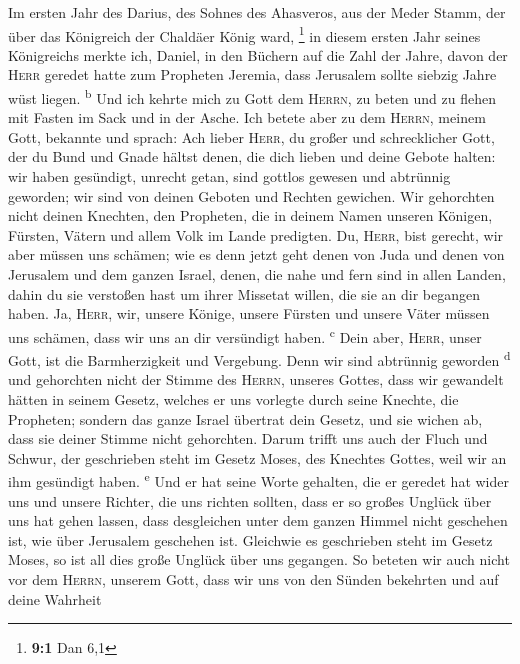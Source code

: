  Im ersten Jahr des Darius, des Sohnes des Ahasveros, aus
der Meder Stamm, der über das Königreich der Chaldäer König ward,
\footnote{\textbf{9:1} Dan 6,1}  in diesem ersten Jahr
seines Königreichs merkte ich, Daniel, in den Büchern auf die Zahl der
Jahre, davon der \textsc{Herr} geredet hatte zum Propheten Jeremia, dass
Jerusalem sollte siebzig Jahre wüst liegen. \textsuperscript{b}
 Und ich kehrte mich zu Gott dem \textsc{Herrn}, zu beten
und zu flehen mit Fasten im Sack und in der Asche.  Ich
betete aber zu dem \textsc{Herrn}, meinem Gott, bekannte und sprach: Ach
lieber \textsc{Herr}, du großer und schrecklicher Gott, der du Bund und
Gnade hältst denen, die dich lieben und deine Gebote halten:
 wir haben gesündigt, unrecht getan, sind gottlos gewesen
und abtrünnig geworden; wir sind von deinen Geboten und Rechten
gewichen.  Wir gehorchten nicht deinen Knechten, den
Propheten, die in deinem Namen unseren Königen, Fürsten, Vätern und
allem Volk im Lande predigten.  Du, \textsc{Herr}, bist
gerecht, wir aber müssen uns schämen; wie es denn jetzt geht denen von
Juda und denen von Jerusalem und dem ganzen Israel, denen, die nahe und
fern sind in allen Landen, dahin du sie verstoßen hast um ihrer Missetat
willen, die sie an dir begangen haben.  Ja, \textsc{Herr},
wir, unsere Könige, unsere Fürsten und unsere Väter müssen uns schämen,
dass wir uns an dir versündigt haben. \textsuperscript{c} 
Dein aber, \textsc{Herr}, unser Gott, ist die Barmherzigkeit und
Vergebung. Denn wir sind abtrünnig geworden \textsuperscript{d}
 und gehorchten nicht der Stimme des \textsc{Herrn},
unseres Gottes, dass wir gewandelt hätten in seinem Gesetz, welches er
uns vorlegte durch seine Knechte, die Propheten;  sondern
das ganze Israel übertrat dein Gesetz, und sie wichen ab, dass sie
deiner Stimme nicht gehorchten. Darum trifft uns auch der Fluch und
Schwur, der geschrieben steht im Gesetz Moses, des Knechtes Gottes, weil
wir an ihm gesündigt haben. \textsuperscript{e}  Und er
hat seine Worte gehalten, die er geredet hat wider uns und unsere
Richter, die uns richten sollten, dass er so großes Unglück über uns hat
gehen lassen, dass desgleichen unter dem ganzen Himmel nicht geschehen
ist, wie über Jerusalem geschehen ist.  Gleichwie es
geschrieben steht im Gesetz Moses, so ist all dies große Unglück über
uns gegangen. So beteten wir auch nicht vor dem \textsc{Herrn}, unserem
Gott, dass wir uns von den Sünden bekehrten und auf deine Wahrheit
